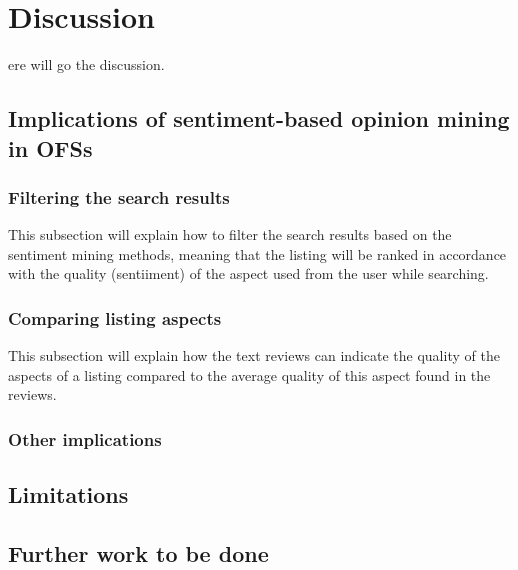%
%
\let\textcircled=\pgftextcircled
\chapter{Discussion}
\label{chap:dis}

ere will go the discussion.

\section{Implications of sentiment-based opinion mining in OFSs}
\subsection{Filtering the search results}
This subsection will explain how to filter the search results based on the sentiment mining methods, meaning that the listing will be ranked in accordance with the quality (sentiiment) of the aspect used from the user while searching. 
\subsection{Comparing listing aspects}
This subsection will explain how the text reviews can indicate the quality of the aspects of a listing compared to the average quality of this aspect found in the reviews.
\subsection{Other implications}
\section{Limitations}
\section{Further work to be done}